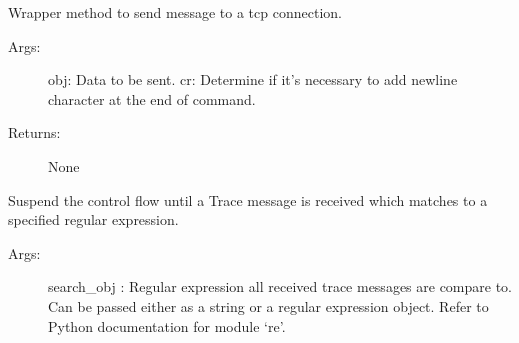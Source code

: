 \documentclass[letterpaper,10pt,english]{sphinxmanual}
\begin{document}
\begin{fulllineitems}
\begin{fulllineitems}
\label{\detokenize{QConnectionLibrary:QConnectionLibrary.connection_base.ConnectionBase.send_obj}}
\sphinxAtStartPar
Wrapper method to send message to a tcp connection.
\begin{description}
\item[{Args:}] \leavevmode
\sphinxAtStartPar
obj: Data to be sent.
cr: Determine if it’s necessary to add newline character at the end of command.

\item[{Returns:}] \leavevmode
\sphinxAtStartPar
None

\end{description}

\end{fulllineitems}


\begin{fulllineitems}
\label{\detokenize{QConnectionLibrary:QConnectionLibrary.connection_base.ConnectionBase.supported_devices}}
\end{fulllineitems}


\begin{fulllineitems}
\label{\detokenize{QConnectionLibrary:QConnectionLibrary.connection_base.ConnectionBase.wait_4_trace}}
\sphinxAtStartPar
Suspend the control flow until a Trace message is received which matches to a specified regular expression.
\begin{description}
\item[{Args:}] \leavevmode
\sphinxAtStartPar
search\_obj : Regular expression all received trace messages are compare to.           Can be passed either as a string or a regular expression object. Refer to Python documentation for module ‘re’.


\end{description}
\end{fulllineitems}
\end{fulllineitems}
\end{document}
